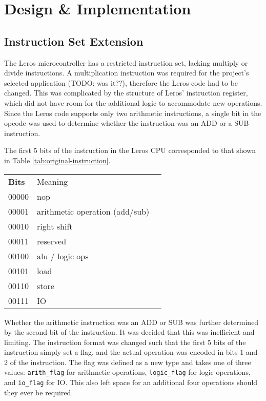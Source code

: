 \section{Design \& Implementation}
\subsection{Instruction Set Extension}
The Leros microcontroller has a restricted instruction set, lacking multiply
or divide instructions. A multiplication instruction was required for the
project's selected application (TODO: was it??), therefore the Leros code
had to
be changed. This was complicated by the structure of Leros' instruction
register, which did not have room for the additional logic to accommodate
new
operations. Since the Leros code supports only two arithmetic instructions,
a single bit in the opcode was used to determine whether the instruction
was an ADD or a SUB instruction.

The first 5 bits of the instruction in the Leros CPU
corresponded to that shown
in Table \ref{tab:original-instruction}.
\begin{table}
\begin{tabular}{|p{}|p{}|p{}|}
\hline
\textbf{Bits} & Meaning \\
00000 & nop \\
00001 & arithmetic operation (add/sub) \\
00010 & right shift \\
00011 & reserved \\
00100 & alu / logic ops \\
00101 & load \\
00110 & store \\
00111 & IO \\
\end{tabular}
\end{table}

Whether the arithmetic instruction was an ADD or SUB was further determined by
the second bit of the instruction. It was decided that this was inefficient and
limiting. The instruction format was changed such that the first 5 bits of the
instruction simply set a flag, and the actual operation was encoded in bits 1
and 2 of the instruction. The flag was defined as a new type and takes one of
three values: \texttt{arith\_flag} for arithmetic operations,
\texttt{logic\_flag} for logic operations, and  
\texttt{io\_flag} for IO. This also left space for an additional four
operations should they ever be required.

